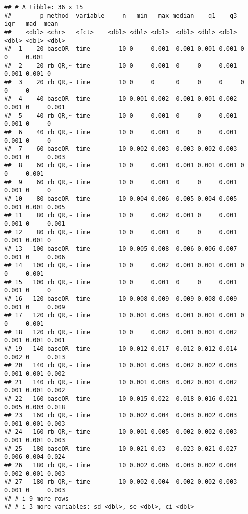 \documentclass[]{tufte-handout}
\begin{document}
\begin{verbatim}
## # A tibble: 36 x 15
##        p method  variable     n   min   max median    q1    q3   iqr   mad  mean
##    <dbl> <chr>   <fct>    <dbl> <dbl> <dbl>  <dbl> <dbl> <dbl> <dbl> <dbl> <dbl>
##  1    20 baseQR  time        10 0     0.001  0.001 0.001 0.001 0     0     0.001
##  2    20 rb QR,~ time        10 0     0.001  0     0     0.001 0.001 0.001 0    
##  3    20 rb QR,~ time        10 0     0      0     0     0     0     0     0    
##  4    40 baseQR  time        10 0.001 0.002  0.001 0.001 0.002 0.001 0     0.001
##  5    40 rb QR,~ time        10 0     0.001  0     0     0.001 0.001 0     0    
##  6    40 rb QR,~ time        10 0     0.001  0     0     0.001 0.001 0     0    
##  7    60 baseQR  time        10 0.002 0.003  0.003 0.002 0.003 0.001 0     0.003
##  8    60 rb QR,~ time        10 0     0.001  0.001 0.001 0.001 0     0     0.001
##  9    60 rb QR,~ time        10 0     0.001  0     0     0.001 0.001 0     0    
## 10    80 baseQR  time        10 0.004 0.006  0.005 0.004 0.005 0.001 0.001 0.005
## 11    80 rb QR,~ time        10 0     0.002  0.001 0     0.001 0.001 0     0.001
## 12    80 rb QR,~ time        10 0     0.001  0     0     0.001 0.001 0.001 0    
## 13   100 baseQR  time        10 0.005 0.008  0.006 0.006 0.007 0.001 0     0.006
## 14   100 rb QR,~ time        10 0     0.002  0.001 0.001 0.001 0     0     0.001
## 15   100 rb QR,~ time        10 0     0.001  0     0     0.001 0.001 0     0    
## 16   120 baseQR  time        10 0.008 0.009  0.009 0.008 0.009 0.001 0     0.009
## 17   120 rb QR,~ time        10 0.001 0.003  0.001 0.001 0.001 0     0     0.001
## 18   120 rb QR,~ time        10 0     0.002  0.001 0.001 0.002 0.001 0.001 0.001
## 19   140 baseQR  time        10 0.012 0.017  0.012 0.012 0.014 0.002 0     0.013
## 20   140 rb QR,~ time        10 0.001 0.003  0.002 0.002 0.003 0.001 0.001 0.002
## 21   140 rb QR,~ time        10 0.001 0.003  0.002 0.001 0.002 0.001 0.001 0.002
## 22   160 baseQR  time        10 0.015 0.022  0.018 0.016 0.021 0.005 0.003 0.018
## 23   160 rb QR,~ time        10 0.002 0.004  0.003 0.002 0.003 0.001 0.001 0.003
## 24   160 rb QR,~ time        10 0.001 0.005  0.002 0.002 0.003 0.001 0.001 0.003
## 25   180 baseQR  time        10 0.021 0.03   0.023 0.021 0.027 0.006 0.004 0.024
## 26   180 rb QR,~ time        10 0.002 0.006  0.003 0.002 0.004 0.002 0.001 0.003
## 27   180 rb QR,~ time        10 0.002 0.004  0.002 0.002 0.003 0.001 0     0.003
## # i 9 more rows
## # i 3 more variables: sd <dbl>, se <dbl>, ci <dbl>
\end{verbatim}
\end{document}
